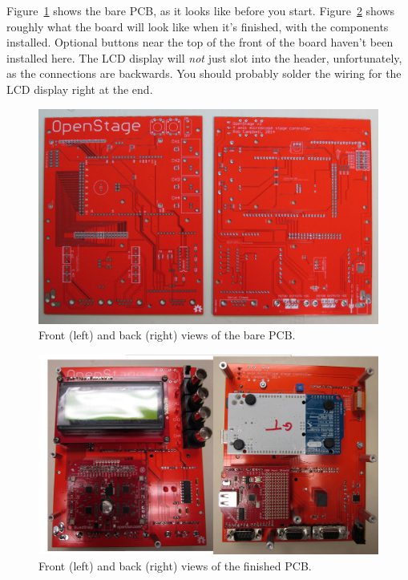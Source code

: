 \documentclass[11pt]{report} %
\begin{document}
Figure~\ref{frontback} shows the bare PCB, as it looks like before you start. Figure~\ref{finished_1} shows roughly what the board will look like when it's finished, with the components installed. Optional buttons near the top of the front of the board haven't been installed here. The LCD display will \textit{not} just slot into the header, unfortunately, as the connections are backwards. You should probably solder the wiring for the LCD display right at the end. 

\begin{figure}[!ht]
\centering
\includegraphics[width=5in]{IMG_3188.JPG}
\caption{Front (left) and back (right) views of the bare PCB.}
\label{frontback}
\end{figure}

\begin{figure}[!ht]
\centering
\includegraphics[width=5in]{finished_1.jpg}
\caption{Front (left) and back (right) views of the finished PCB.}
\label{finished_1}
\end{figure}

\clearpage
\end{document}
